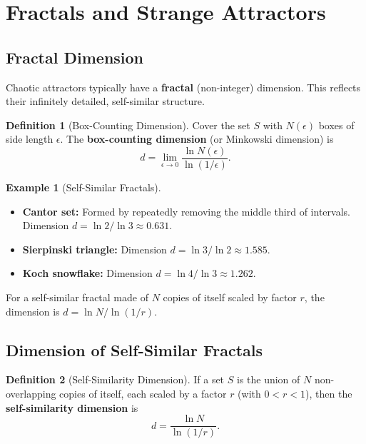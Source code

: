 \documentclass[11pt,letterpaper]{article}
\theoremstyle{definition}
\newtheorem{definition}{Definition}[section]
\newtheorem{example}{Example}[section]
\theoremstyle{plain}
\theoremstyle{remark}
\begin{document}
\section{Fractals and Strange Attractors}\label{sec:fractals}

\subsection{Fractal Dimension}

Chaotic attractors typically have a \textbf{fractal} (non-integer) dimension.
This reflects their infinitely detailed, self-similar structure.

\begin{definition}[Box-Counting Dimension]
Cover the set $S$ with $N(\epsilon)$ boxes of side length $\epsilon$.  The
\textbf{box-counting dimension} (or Minkowski dimension) is
\begin{equation}
  d = \lim_{\epsilon\to 0}\frac{\ln N(\epsilon)}{\ln(1/\epsilon)}.
\end{equation}
\end{definition}

\begin{example}[Self-Similar Fractals]
\begin{itemize}[leftmargin=2em]
\item \textbf{Cantor set:} Formed by repeatedly removing the middle third
      of intervals.  Dimension $d = \ln 2/\ln 3 \approx 0.631$.
\item \textbf{Sierpinski triangle:} Dimension $d = \ln 3/\ln 2 \approx 1.585$.
\item \textbf{Koch snowflake:} Dimension $d = \ln 4/\ln 3 \approx 1.262$.
\end{itemize}
For a self-similar fractal made of $N$ copies of itself scaled by factor
$r$, the dimension is $d = \ln N / \ln(1/r)$.
\end{example}

\subsection{Dimension of Self-Similar Fractals}

\begin{definition}[Self-Similarity Dimension]
If a set $S$ is the union of $N$ non-overlapping copies of itself, each
scaled by a factor $r$ (with $0 < r < 1$), then the
\textbf{self-similarity dimension} is
\begin{equation}
  d = \frac{\ln N}{\ln(1/r)}.
\end{equation}
\end{definition}
\end{document}
